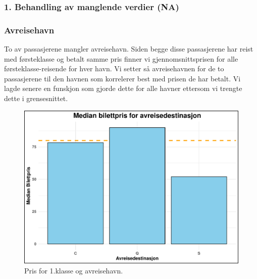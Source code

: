 \documentclass[
]{article}
\newenvironment{Shaded}{\begin{snugshade}}{\end{snugshade}}
\newcommand{\AttributeTok}[1]{\textcolor[rgb]{0.13,0.29,0.53}{#1}}
\newcommand{\ConstantTok}[1]{\textcolor[rgb]{0.56,0.35,0.01}{#1}}
\newcommand{\DecValTok}[1]{\textcolor[rgb]{0.00,0.00,0.81}{#1}}
\newcommand{\FunctionTok}[1]{\textcolor[rgb]{0.13,0.29,0.53}{\textbf{#1}}}
\newcommand{\NormalTok}[1]{#1}
\newcommand{\OtherTok}[1]{\textcolor[rgb]{0.56,0.35,0.01}{#1}}
\newcommand{\SpecialCharTok}[1]{\textcolor[rgb]{0.81,0.36,0.00}{\textbf{#1}}}
\newcommand{\StringTok}[1]{\textcolor[rgb]{0.31,0.60,0.02}{#1}}
\begin{document}
\begin{Shaded}
\end{Shaded}

\subsubsection{1. Behandling av manglende verdier
(NA)}\label{behandling-av-manglende-verdier-na}

\subsubsection{Avreisehavn}\label{avreisehavn}

To av passasjerene mangler avreisehavn. Siden begge disse passasjerene
har reist med førsteklasse og betalt samme pris finner vi
gjennomsnittsprisen for alle førsteklasse-reisende for hver havn. Vi
setter så avreisehavnen for de to passasjerene til den havnen som
korrelerer best med prisen de har betalt. Vi lagde senere en funskjon
som gjorde dette for alle havner ettersom vi trengte dette i
grensesnittet.

\begin{figure}[H]

{\centering \includegraphics[width=0.8\linewidth]{presentation_files/figure-latex/unnamed-chunk-4-1} 

}

\caption{Pris for 1.klasse og avreisehavn.}\label{fig:unnamed-chunk-4}
\end{figure}
\end{document}
